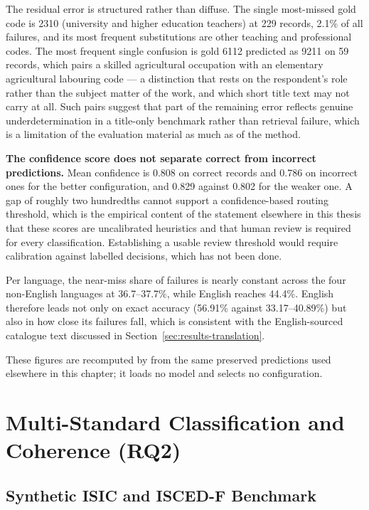 The residual error is structured rather than diffuse. The single
most-missed gold code is 2310 (university and higher education teachers) at
229 records, 2.1\% of all failures, and its most frequent substitutions are
other teaching and professional codes. The most frequent single confusion
is gold 6112 predicted as 9211 on 59 records, which pairs a skilled
agricultural occupation with an elementary agricultural labouring code ---
a distinction that rests on the respondent's role rather than the subject
matter of the work, and which short title text may not carry at all. Such
pairs suggest that part of the remaining error reflects genuine
underdetermination in a title-only benchmark rather than retrieval failure,
which is a limitation of the evaluation material as much as of the method.

\textbf{The confidence score does not separate correct from incorrect
predictions.} Mean confidence is 0.808 on correct records and 0.786 on
incorrect ones for the better configuration, and 0.829 against 0.802 for
the weaker one. A gap of roughly two hundredths cannot support a
confidence-based routing threshold, which is the empirical content of the
statement elsewhere in this thesis that these scores are uncalibrated
heuristics and that human review is required for every classification.
Establishing a usable review threshold would require calibration against
labelled decisions, which has not been done.

Per language, the near-miss share of failures is nearly constant across the
four non-English languages at 36.7--37.7\%, while English reaches 44.4\%.
English therefore leads not only on exact accuracy (56.91\% against
33.17--40.89\%) but also in how close its failures fall, which is
consistent with the English-sourced catalogue text discussed in
Section~\ref{sec:results-translation}.

These figures are recomputed by 
from the same preserved predictions used elsewhere in this chapter; it
loads no model and selects no configuration.

\section{Multi-Standard Classification and Coherence (RQ2)}
\label{sec:res-isic-isced}

\subsection{Synthetic ISIC and ISCED-F Benchmark}

